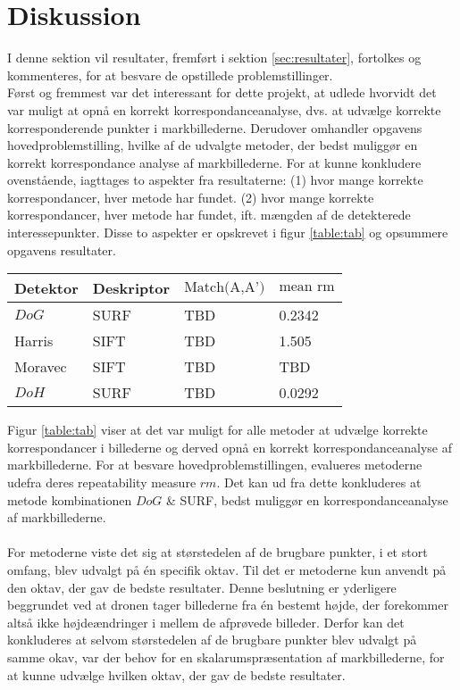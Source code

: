 \chapter{Diskussion}
I denne sektion vil resultater, fremført i sektion \ref{sec:resultater}, fortolkes og kommenteres, for at besvare de opstillede problemstillinger. \\
Først og fremmest var det interessant for dette projekt, at udlede hvorvidt det var muligt at opnå en korrekt korrespondanceanalyse, dvs. at udvælge korrekte korresponderende punkter i markbillederne. Derudover omhandler opgavens hovedproblemstilling, hvilke af de udvalgte metoder, der bedst muliggør en korrekt korrespondance analyse af markbillederne. For at kunne konkludere ovenstående, iagttages to aspekter fra resultaterne: (1) hvor mange korrekte korrespondancer, hver metode har fundet. (2) hvor mange korrekte korrespondancer, hver metode har fundet, ift. mængden af de detekterede interessepunkter. Disse to aspekter er opskrevet i figur \ref{table:tab} og opsummere opgavens resultater.
\begin{center}
    \begin{tabular}{ | l | l | l | l |}
    \hline
    Detektor & Deskriptor & $\text{Match(A,A')}$ & $\text{mean rm}$ \\ \hline
    $DoG$ & SURF & TBD & 0.2342 \\ \hline       
    Harris & SIFT & TBD & 1.505 \\ \hline    
    Moravec & SIFT & TBD & TBD \\ \hline    
    $DoH$ & SURF & TBD & 0.0292 \\ \hline    
    \end{tabular}
    \label{table:tab}
\end{center}
Figur \ref{table:tab} viser at det var muligt for alle metoder at udvælge korrekte korrespondancer i billederne og derved opnå en korrekt korrespondanceanalyse af markbillederne. For at besvare hovedproblemstillingen, evalueres metoderne udefra deres repeatability measure $rm$. Det kan ud fra dette konkluderes at metode kombinationen $DoG$ \& SURF, bedst muliggør en korrespondanceanalyse af markbillederne. \\ \\
For metoderne viste det sig at størstedelen af de brugbare punkter, i et stort omfang, blev udvalgt på én specifik oktav. Til det er metoderne kun anvendt på den oktav, der gav de bedste resultater. Denne beslutning er yderligere beggrundet ved at dronen tager billederne fra én bestemt højde, der forekommer altså ikke højdeændringer i mellem de afprøvede billeder. Derfor kan det konkluderes at selvom størstedelen af de brugbare punkter blev udvalgt på samme okav, var der behov for en skalarumspræsentation af markbillederne, for at kunne udvælge hvilken oktav, der gav de bedste resultater.
